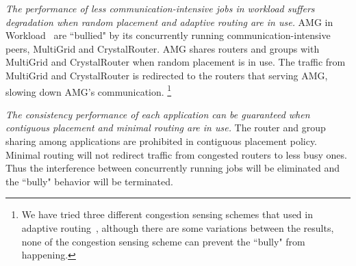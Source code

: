 \emph{The performance of less communication-intensive jobs in workload suffers degradation when random placement and adaptive routing are in use.} 
AMG in Workload~ are ``bullied" by its concurrently running communication-intensive peers, MultiGrid and CrystalRouter. 
AMG shares routers and groups with MultiGrid and CrystalRouter when random placement is in use. 
The traffic from MultiGrid and CrystalRouter is redirected to the routers that serving AMG, 
slowing down AMG's communication. 
\footnote{We have tried three different congestion sensing schemes that used in adaptive routing~\cite{won-prog-adaptive}, although there are some variations between the results, none of the congestion sensing scheme can prevent the ``bully" from happening.}

\emph{The consistency performance of each application can be guaranteed when contiguous placement and minimal routing are in use.} 
The router and group sharing among applications are prohibited in contiguous placement policy. Minimal routing will not redirect traffic from congested routers to less busy ones.
Thus the interference between concurrently running jobs will be eliminated and the ``bully" behavior will be terminated. 

